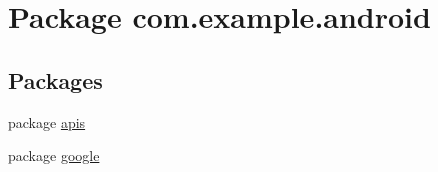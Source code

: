 \hypertarget{namespacecom_1_1example_1_1android}{\section{Package com.\-example.\-android}
\label{namespacecom_1_1example_1_1android}
}
\subsection*{Packages}
\begin{DoxyCompactItemize}
\item 
package \hyperlink{namespacecom_1_1example_1_1android_1_1apis}{apis}
\item 
package \hyperlink{namespacecom_1_1example_1_1android_1_1google}{google}
\end{DoxyCompactItemize}
